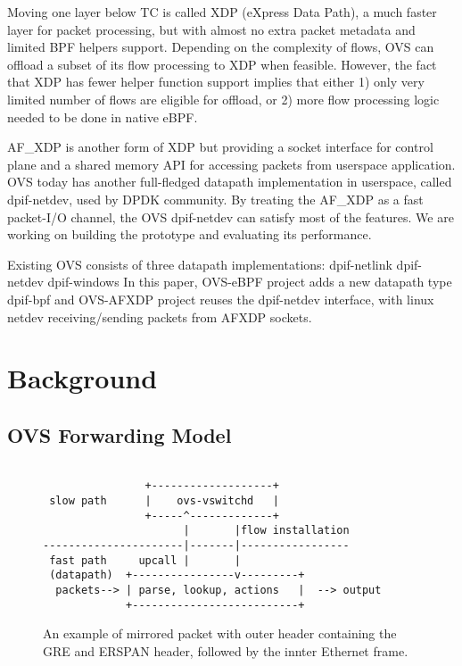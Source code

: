 \documentclass[10pt]{sigplanconf}
\begin{document}
Moving one layer below TC is called XDP (eXpress Data Path), a much faster layer for packet
processing, but with almost no extra packet metadata and limited BPF helpers support.
Depending on the complexity of flows, OVS can offload a subset of its flow processing to XDP
when feasible. However, the fact that XDP has fewer helper function support implies that either
1) only very limited number of flows are eligible for offload, or 2) more flow processing logic
needed to be done in native eBPF.
 
AF\_XDP is another form of XDP but providing a socket interface for control plane and a shared
memory API for accessing packets from userspace application. OVS today has another full-fledged
datapath implementation in userspace, called dpif-netdev, used by DPDK community.
By treating the AF\_XDP as a fast packet-I/O channel, the OVS dpif-netdev can satisfy most of the
features. We are working on building the prototype and evaluating its performance.


Existing OVS consists of three datapath implementations:
dpif-netlink
dpif-netdev
dpif-windows
In this paper, OVS-eBPF project adds a new datapath type
dpif-bpf
and OVS-AFXDP project reuses the dpif-netdev interface, with
linux netdev receiving/sending packets from AFXDP sockets.  

\section{Background}

\subsection{OVS Forwarding Model}

\begin{figure}
{\scriptsize
\begin{verbatim}
              
                +-------------------+
 slow path      |    ovs-vswitchd   |
                +-----^-------------+
                      |       |flow installation
----------------------|-------|-----------------
 fast path     upcall |       | 
 (datapath)  +----------------v---------+ 
  packets--> | parse, lookup, actions   |  --> output
             +--------------------------+
\end{verbatim}
}
\vspace{-1.0em}
\caption{An example of mirrored packet with outer header containing
the GRE and ERSPAN header, followed by the innter Ethernet frame.}
\label{erspanhdr}
\vspace{-1.0em}
\end{figure}
\end{document}
